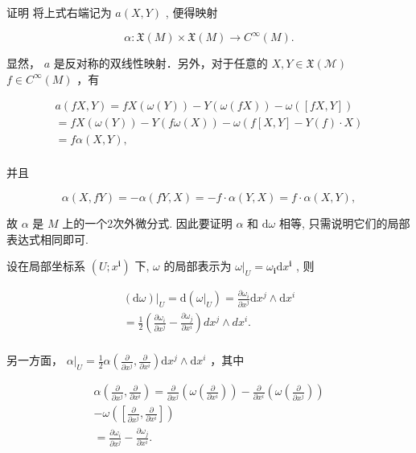证明 将上式右端记为  $a(X,Y)$ , 便得映射

$$
\alpha : \mathfrak {X} (M) \times \mathfrak {X} (M) \rightarrow C ^ {\infty} (M).
$$

显然，  $a$  是反对称的双线性映射．另外，对于任意的  $X,Y\in \mathfrak{X}(\mathcal{M})$ $f\in C^{\infty}(M)$  ，有

$$
\begin{array}{l} a (f X, Y) = f X (\omega (Y)) - Y (\omega (f X)) - \omega ([ f X, Y ]) \\ = f X (\omega (Y)) - Y (f \omega (X)) - \omega (f [ X, Y ] - Y (f) \cdot X) \\ = f \alpha (X, Y), \\ \end{array}
$$

并且

$$
\alpha (X, f Y) = - \alpha (f Y, X) = - f \cdot \alpha (Y, X) = f \cdot \alpha (X, Y),
$$

故  $\alpha$  是  $M$  上的一个2次外微分式. 因此要证明  $\alpha$  和  $\mathrm{d}\omega$  相等, 只需说明它们的局部表达式相同即可.

设在局部坐标系  $(U; x^{\mathbf{i}})$  下,  $\omega$  的局部表示为  $\omega|_{U} = \omega_{\mathbf{i}} \mathrm{d}x^{\mathbf{i}}$ , 则

$$
\begin{array}{l} \left. (\mathrm {d} \omega) \right| _ {U} = \mathrm {d} (\omega | _ {U}) = \frac {\partial \omega_ {i}}{\partial x ^ {j}} \mathrm {d} x ^ {j} \wedge \mathrm {d} x ^ {i} \\ = \frac {1}{2} \left(\frac {\partial \omega_ {i}}{\partial x ^ {j}} - \frac {\partial \omega_ {j}}{\partial x ^ {i}}\right) d x ^ {j} \wedge d x ^ {i}. \\ \end{array}
$$

另一方面，  $\alpha |_{U} = \frac{1}{2}\alpha \left(\frac{\partial}{\partial x^{j}},\frac{\partial}{\partial x^{i}}\right)\mathrm{d}x^{j}\wedge \mathrm{d}x^{i}$  ，其中

$$
\begin{array}{l} \alpha \left(\frac {\partial}{\partial x ^ {j}}, \frac {\partial}{\partial x ^ {i}}\right) = \frac {\partial}{\partial x ^ {j}} \left(\omega \left(\frac {\partial}{\partial x ^ {i}}\right)\right) - \frac {\partial}{\partial x ^ {i}} \left(\omega \left(\frac {\partial}{\partial x ^ {j}}\right)\right) \\ - \omega \left(\left[ \frac {\partial}{\partial x ^ {j}}, \frac {\partial}{\partial x ^ {i}} \right]\right) \\ = \frac {\partial \omega_ {i}}{\partial x ^ {j}} - \frac {\partial \omega_ {j}}{\partial x ^ {i}}. \\ \end{array}
$$

